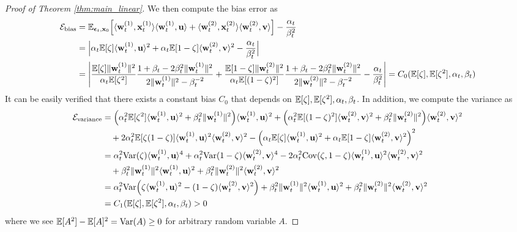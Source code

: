 \begin{proof}[Proof of Theorem \ref{thm:main_linear}]
We then compute the bias error as 
\begin{align*}
    {\mathcal{E}}_{\rm bias}
    &= {\mathbb{E}}_{{\boldsymbol{\epsilon}}_{t}, {\mathbf{x}}_0} \Big[  \langle {\mathbf w}_t^{(1)}, {\mathbf{x}}_t^{(1)} \rangle \langle {\mathbf w}_t^{(1)}, {\mathbf u} \rangle +  \langle {\mathbf w}_t^{(2)} , {\mathbf{x}}_t^{(2)} \rangle  \langle {\mathbf w}_t^{(2)}, {\mathbf v} \rangle  \Big] - \frac{\alpha_t}{\beta_t^2 }\\
    &= \Big| \alpha_t {\mathbb{E}}[\zeta] \langle {\mathbf w}_t^{(1)}, {\mathbf u} \rangle^2 + \alpha_t {\mathbb{E}}[1-\zeta] \langle {\mathbf w}_t^{(2)}, {\mathbf v}\rangle^2 - \frac{\alpha_t}{\beta_t^2}  \Big| \\
    &=\left| \frac{{\mathbb{E}}[\zeta] \| {\mathbf w}_t^{(1)}  \|^2}{\alpha_t {\mathbb{E}}[\zeta^2]} \frac{1 + \beta_t - 2 \beta_t^2 \| {\mathbf w}_t^{(1)} \|^2}{2  \| {\mathbf w}_t^{(1)} \|^2 - \beta_t^{-2} } + \frac{{\mathbb{E}}[1-\zeta] \| {\mathbf w}_t^{(2)}  \|^2}{\alpha_t {\mathbb{E}}[(1-\zeta)^2]} \frac{1 + \beta_t - 2 \beta_t^2 \| {\mathbf w}_t^{(2)} \|^2}{2  \| {\mathbf w}_t^{(2)} \|^2 - \beta_t^{-2} } - \frac{\alpha_t}{\beta_t^2} \right| = C_0({{\mathbb{E}}[\zeta], {\mathbb{E}}[\zeta^2], \alpha_t, \beta_t})
\end{align*}
It can be easily verified that there exists a constant bias $C_0$ that depends on ${\mathbb{E}}[\zeta], {\mathbb{E}}[\zeta^2], \alpha_t, \beta_t$. In addition, we compute the variance as 
\begin{align*}
    {\mathcal{E}}_{\rm variance} &= \Big( \alpha_t^2 {\mathbb{E}}[\zeta^2] \langle {\mathbf w}_t^{(1)}, {\mathbf u} \rangle^2 + \beta_t^2 \|{\mathbf w}_t^{(1)} \|^2\Big) \langle {\mathbf w}_t^{(1)}, {\mathbf u} \rangle^2 + \Big( \alpha_t^2 {\mathbb{E}}[(1-\zeta)^2] \langle {\mathbf w}_t^{(2)}, {\mathbf v} \rangle^2 + \beta_t^2 \| {\mathbf w}_t^{(2)}\|^2 \Big) \langle {\mathbf w}_t^{(2)}, {\mathbf v} \rangle^2 \\
    &\quad + 2 \alpha_t^2 {\mathbb{E}}[\zeta(1- \zeta)] \langle {\mathbf w}_t^{(1)}, {\mathbf u} \rangle^2 \langle {\mathbf w}_t^{(2)}, {\mathbf v} \rangle^2  - \Big( \alpha_t {\mathbb{E}}[\zeta] \langle {\mathbf w}_t^{(1)}, {\mathbf u} \rangle^2 + \alpha_t {\mathbb{E}}[1-\zeta] \langle {\mathbf w}_t^{(2)}, {\mathbf v}\rangle^2  \Big)^2 \\
    &= \alpha_t^2  {\rm Var}(\zeta) \langle {\mathbf w}_{t}^{(1)}, {\mathbf u} \rangle^4 + \alpha_t^2 {\rm Var}(1-\zeta) \langle {\mathbf w}_{t}^{(2)}, {\mathbf v} \rangle^4 - 2 \alpha_t^2 {\rm Cov}(\zeta, 1- \zeta) \langle {\mathbf w}_t^{(1)}, {\mathbf u} \rangle^2 \langle {\mathbf w}_t^{(2)}, {\mathbf v} \rangle^2  \\
    &\quad + \beta_t^2 \| {\mathbf w}_t^{(1)} \|^2 \langle {\mathbf w}_t^{(1)}, {\mathbf u} \rangle^2 + \beta_t^2 \| {\mathbf w}_t^{(2)} \|^2 \langle {\mathbf w}_t^{(2)}, {\mathbf v} \rangle^2\\
    &=  \alpha_t^2 {\rm Var}\Big( \zeta \langle{\mathbf w}_{t}^{(1)}, {\mathbf u} \rangle^2 - (1-\zeta) \langle{\mathbf w}_t^{(2)}, {\mathbf v}  \rangle^2 \Big)  +  \beta_t^2 \| {\mathbf w}_t^{(1)} \|^2 \langle {\mathbf w}_t^{(1)}, {\mathbf u} \rangle^2 + \beta_t^2 \| {\mathbf w}_t^{(2)} \|^2 \langle {\mathbf w}_t^{(2)}, {\mathbf v} \rangle^2 \\
    &= C_1({\mathbb{E}}[\zeta], {\mathbb{E}}[\zeta^2], \alpha_t, \beta_t) > 0
\end{align*}
where we see ${\mathbb{E}}[A^2] - {\mathbb{E}}[A]^2 = {\rm Var}(A) \geq 0$ for arbitrary random variable $A$. 
\end{proof}



